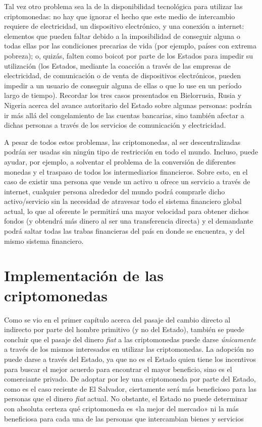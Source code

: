 \documentclass[12pt,a4paper,twoside]{book}
\begin{document}
Tal vez otro problema sea la de la disponibilidad tecnológica para utilizar las criptomonedas: no hay que ignorar el hecho que este medio de intercambio requiere de electricidad, un dispositivo electrónico, y una conexión a internet: elementos que pueden faltar debido a la imposibilidad de conseguir alguna o todas ellas por las condiciones precarias de vida (por ejemplo, países con extrema pobreza); o, quizás, falten como boicot por parte de los Estados para impedir su utilización (los Estados, mediante la coacción a través de las empresas de electricidad, de comunicación o de venta de dispositivos electrónicos, pueden impedir a un usuario de conseguir alguna de ellas o que lo use en un período largo de tiempo). Recordar los tres casos presentados en Bielorrusia, Rusia y Nigeria acerca del avance autoritario del Estado sobre algunas personas: podrán ir más allá del congelamiento de las cuentas bancarias, sino también afectar a dichas personas a través de los servicios de comunicación y electricidad.

A pesar de todos estos problemas, las criptomonedas, al ser descentralizadas podrán ser usadas sin ningún tipo de restricción en todo el mundo. Incluso, puede ayudar, por ejemplo, a solventar el problema de la conversión de diferentes monedas y el traspaso de todos los intermediarios financieros. Sobre esto, en el caso de existir una persona que vende un activo u ofrece un servicio a través de internet, cualquier persona alrededor del mundo podrá comprarle dicho activo/servicio sin la necesidad de atravesar todo el sistema financiero global actual, lo que al oferente le permitirá una mayor velocidad para obtener dichos fondos (y obtendrá más dinero al ser una transferencia directa) y el demandante podrá saltar todas las trabas financieras del país en donde se encuentra, y del mismo sistema financiero.

\chapter{Implementación de las criptomonedas}
Como se vio en el primer capítulo acerca del pasaje del cambio directo al indirecto por parte del hombre primitivo (y no del Estado), también se puede concluir que el pasaje del dinero \textit{fiat} a las criptomonedas puede darse \textit{únicamente} a través de los mismos interesados en utilizar las criptomonedas. La adopción no puede darse a través del Estado, ya que no es el Estado quien tiene los incentivos para buscar el mejor acuerdo para encontrar el mayor beneficio, sino es el comerciante privado. De adoptar por ley una criptomoneda por parte del Estado, como es el caso reciente de El Salvador, ciertamente será más beneficioso para las personas que el dinero \textit{fiat} actual. No obstante, el Estado no puede determinar con absoluta certeza qué criptomoneda es «la mejor del mercado» ni la más beneficiosa para cada una de las personas que intercambian bienes y servicios
\end{document}
